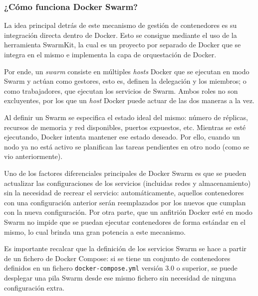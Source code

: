 \subsubsection*{¿Cómo funciona Docker Swarm?}
La idea principal detrás de este mecanismo de gestión de contenedores es su
integración directa dentro de Docker. Esto se consigue mediante el uso de la
herramienta SwarmKit, la cual es un proyecto por separado de Docker que se integra
en el mismo e implementa la capa de orquestación de Docker.

Por ende, un \textit{swarm} consiste en múltiples \textit{hosts} Docker que se
ejecutan en modo Swarm y actúan como gestores, esto es, definen la delegación
y los miembros; o como trabajadores, que ejecutan los servicios de Swarm. Ambos roles
no son excluyentes, por los que un \textit{host} Docker puede actuar de las
dos maneras a la vez.

Al definir un Swarm se especifica el estado ideal del mismo: número de réplicas, 
recursos de memoria y red disponibles, puertos expuestos, etc. Mientras se esté
ejecutando, Docker intenta mantener ese estado deseado. Por ello, cuando un
nodo ya no está activo se planifican las tareas pendientes en otro nodo 
(como se vio anteriormente).

Uno de los factores diferenciales principales de Docker Swarm es que se pueden
actualizar las configuraciones de los servicios (incluidas redes y almacenamiento)
sin la necesidad de recrear el servicio: automáticamente, aquellos contenedores
con una configuración anterior serán reemplazados por los nuevos que cumplan
con la nueva configuración. Por otra parte, que un anfitrión Docker esté en modo
Swarm no impide que se puedan ejecutar contenedores de forma estándar en el mismo,
lo cual brinda una gran potencia a este mecanismo.

Es importante recalcar que la definición de los servicios Swarm se hace a partir
de un fichero de Docker Compose: si se tiene un conjunto de contenedores
definidos en un fichero \texttt{docker-compose.yml} versión 3.0 o superior, se
puede desplegar una pila Swarm desde ese mismo fichero sin necesidad de ninguna
configuración extra.

